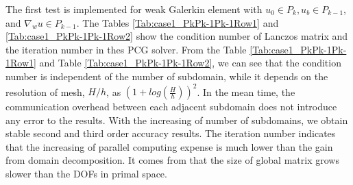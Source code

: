 		The first test is implemented for weak Galerkin element with $ u_0 \in P_k, u_b \in P_{k - 1} $, and $ \nabla_w u \in P_{k - 1} $. The Tables \ref{Tab:case1_PkPk-1Pk-1Row1} and \ref{Tab:case1_PkPk-1Pk-1Row2} show the condition number of Lanczos matrix and the iteration number in thes PCG solver. From the Table \ref{Tab:case1_PkPk-1Pk-1Row1} and Table \ref{Tab:case1_PkPk-1Pk-1Row2}, we can see that the condition number is independent of the number of subdomain, while it depends on the resolution of mesh, $ H/h $, as $ (1 + log(\frac{H}{h}))^{2} $. In the mean time, the communication overhead between each adjacent subdomain does not introduce any error to the results. With the increasing of number of subdomains, we obtain stable second and third order accuracy results. The iteration number indicates that the increasing of parallel computing expense is much lower than the gain from domain decomposition. It comes from that the size of global matrix grows slower than the DOFs in primal space.
		
		
		
